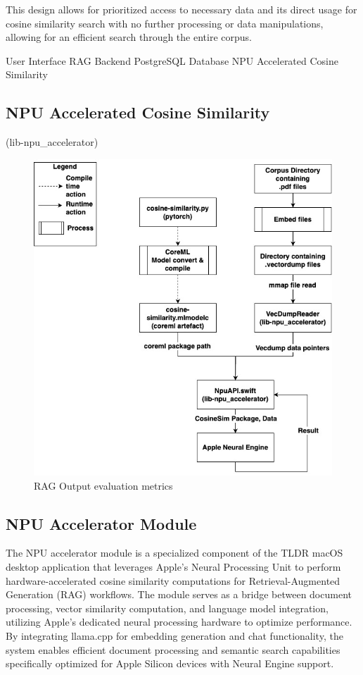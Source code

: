 This design allows for prioritized access to necessary data and its direct usage for cosine similarity search with no further processing or data manipulations, allowing for an efficient search through the entire corpus.




User Interface RAG Backend  PostgreSQL Database NPU Accelerated Cosine Similarity 
\subsection{NPU Accelerated Cosine Similarity}
\label{subsec:AppDesignModules-NpuCosineSim}
(lib-npu\_accelerator)
\begin{figure}[H]
    \centering
    \includegraphics[width=0.8\linewidth]{images/npu-accelerator-module-worklfow.jpg}
    \caption{RAG Output evaluation metrics ~\cite{cardenas2023rag}}
    \label{fig:autoregressive_decoding}
\end{figure}

\subsection{NPU Accelerator Module}

The NPU accelerator module is a specialized component of the TLDR macOS desktop application that leverages Apple's Neural Processing Unit to perform hardware-accelerated cosine similarity computations for Retrieval-Augmented Generation (RAG) workflows. The module serves as a bridge between document processing, vector similarity computation, and language model integration, utilizing Apple's dedicated neural processing hardware to optimize performance. By integrating llama.cpp for embedding generation and chat functionality, the system enables efficient document processing and semantic search capabilities specifically optimized for Apple Silicon devices with Neural Engine support.

